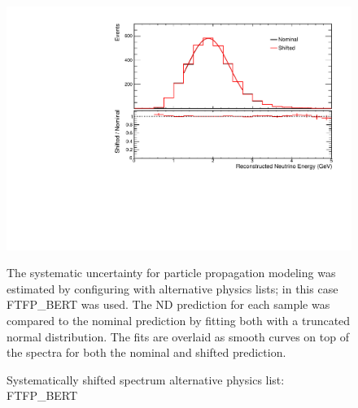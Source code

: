{\begin{figure}
\begin{center}
\includegraphics[width=\textwidth]{figures/systs/params/nd_FTFP_BERT.pdf}
\end{center}
\caption{Systematically shifted spectrum alternative \geant
physics list: FTFP\_BERT}{
The systematic uncertainty for particle propagation modeling was estimated
by configuring \geant with alternative physics lists; in this case FTFP\_BERT
was used.
The ND prediction for each sample was compared to the nominal prediction
by fitting both with a truncated normal distribution.
The fits are overlaid as smooth curves on top of the spectra for both
the nominal and shifted prediction.
}
\label{syst_param_nd_FTFP_BERT}

\end{figure}


}
